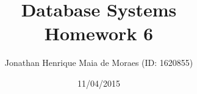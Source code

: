 \title{Database Systems \\ Homework 6}
\author{Jonathan Henrique Maia de Moraes (ID: 1620855)}
\date{11/04/2015}
\maketitle
